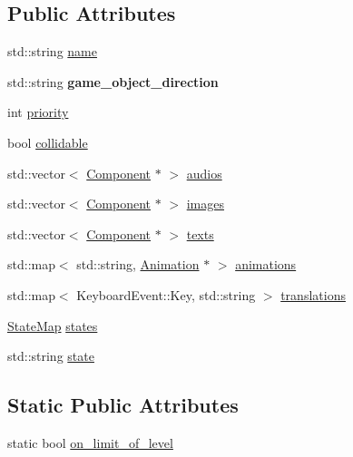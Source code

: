 \subsection*{Public Attributes}
\begin{DoxyCompactItemize}
\item 
std\+::string \hyperlink{classengine_1_1_game_object_a1f104f7af4f351e6d3278319762c9fe5}{name}
\item 
std\+::string {\bfseries game\+\_\+object\+\_\+direction}\hypertarget{classengine_1_1_game_object_a44e5d9209f5ff0f19d83f7d221037632}{}\label{classengine_1_1_game_object_a44e5d9209f5ff0f19d83f7d221037632}

\item 
int \hyperlink{classengine_1_1_game_object_a159ecaca30229e302793b11a75bd13c2}{priority}
\item 
bool \hyperlink{classengine_1_1_game_object_a1044128797889af9aee10599b09174ed}{collidable}
\item 
std\+::vector$<$ \hyperlink{classengine_1_1_component}{Component} $\ast$ $>$ \hyperlink{classengine_1_1_game_object_a1466e1d3fa4d30de06df15791d15cbc7}{audios}
\item 
std\+::vector$<$ \hyperlink{classengine_1_1_component}{Component} $\ast$ $>$ \hyperlink{classengine_1_1_game_object_af79b2f893d53454481d085825e4898c8}{images}
\item 
std\+::vector$<$ \hyperlink{classengine_1_1_component}{Component} $\ast$ $>$ \hyperlink{classengine_1_1_game_object_aaff0b5ab01495a8f4cb806eb39300534}{texts}
\item 
std\+::map$<$ std\+::string, \hyperlink{classengine_1_1_animation}{Animation} $\ast$ $>$ \hyperlink{classengine_1_1_game_object_a5cb70de44e18b89e4d298de907f1668a}{animations}
\item 
std\+::map$<$ Keyboard\+Event\+::\+Key, std\+::string $>$ \hyperlink{classengine_1_1_game_object_a6ac31651c772a941b08c4ce6f89c3bbc}{translations}
\item 
\hyperlink{classengine_1_1_state_map}{State\+Map} \hyperlink{classengine_1_1_game_object_a109beba63a929e3be8c4c958591cd1a9}{states}
\item 
std\+::string \hyperlink{classengine_1_1_game_object_a485c6dde0f7daed4ce480d577e621f87}{state}
\end{DoxyCompactItemize}
\subsection*{Static Public Attributes}
\begin{DoxyCompactItemize}
\item 
static bool \hyperlink{classengine_1_1_game_object_aea78ad4cdb280a61b050b89a280af7bd}{on\+\_\+limit\+\_\+of\+\_\+level}
\end{DoxyCompactItemize}
